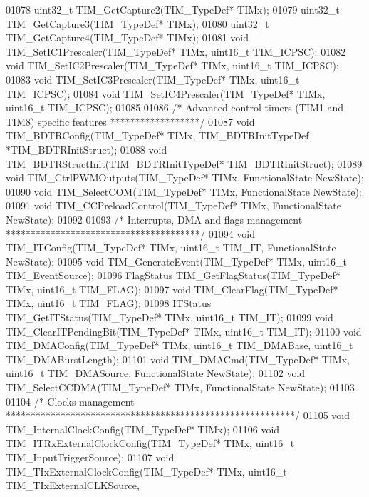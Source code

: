 \begin{DoxyCode}
01078 uint32\_t TIM_GetCapture2(TIM\_TypeDef* TIMx);
01079 uint32\_t TIM_GetCapture3(TIM\_TypeDef* TIMx);
01080 uint32\_t TIM_GetCapture4(TIM\_TypeDef* TIMx);
01081 \textcolor{keywordtype}{void} TIM_SetIC1Prescaler(TIM\_TypeDef* TIMx, uint16\_t TIM\_ICPSC);
01082 \textcolor{keywordtype}{void} TIM_SetIC2Prescaler(TIM\_TypeDef* TIMx, uint16\_t TIM\_ICPSC);
01083 \textcolor{keywordtype}{void} TIM_SetIC3Prescaler(TIM\_TypeDef* TIMx, uint16\_t TIM\_ICPSC);
01084 \textcolor{keywordtype}{void} TIM_SetIC4Prescaler(TIM\_TypeDef* TIMx, uint16\_t TIM\_ICPSC);
01085 
01086 \textcolor{comment}{/* Advanced-control timers (TIM1 and TIM8) specific features ******************/}
01087 \textcolor{keywordtype}{void} TIM_BDTRConfig(TIM\_TypeDef* TIMx, TIM\_BDTRInitTypeDef *TIM\_BDTRInitStruct);
01088 \textcolor{keywordtype}{void} TIM_BDTRStructInit(TIM\_BDTRInitTypeDef* TIM\_BDTRInitStruct);
01089 \textcolor{keywordtype}{void} TIM_CtrlPWMOutputs(TIM\_TypeDef* TIMx, FunctionalState NewState);
01090 \textcolor{keywordtype}{void} TIM_SelectCOM(TIM\_TypeDef* TIMx, FunctionalState NewState);
01091 \textcolor{keywordtype}{void} TIM_CCPreloadControl(TIM\_TypeDef* TIMx, FunctionalState NewState);
01092 
01093 \textcolor{comment}{/* Interrupts, DMA and flags management ***************************************/}
01094 \textcolor{keywordtype}{void} TIM_ITConfig(TIM\_TypeDef* TIMx, uint16\_t TIM\_IT, FunctionalState NewState);
01095 \textcolor{keywordtype}{void} TIM_GenerateEvent(TIM\_TypeDef* TIMx, uint16\_t TIM\_EventSource);
01096 FlagStatus TIM_GetFlagStatus(TIM\_TypeDef* TIMx, uint16\_t TIM\_FLAG);
01097 \textcolor{keywordtype}{void} TIM_ClearFlag(TIM\_TypeDef* TIMx, uint16\_t TIM\_FLAG);
01098 ITStatus TIM_GetITStatus(TIM\_TypeDef* TIMx, uint16\_t TIM\_IT);
01099 \textcolor{keywordtype}{void} TIM_ClearITPendingBit(TIM\_TypeDef* TIMx, uint16\_t TIM\_IT);
01100 \textcolor{keywordtype}{void} TIM_DMAConfig(TIM\_TypeDef* TIMx, uint16\_t TIM\_DMABase, uint16\_t TIM\_DMABurstLength);
01101 \textcolor{keywordtype}{void} TIM_DMACmd(TIM\_TypeDef* TIMx, uint16\_t TIM\_DMASource, FunctionalState NewState);
01102 \textcolor{keywordtype}{void} TIM_SelectCCDMA(TIM\_TypeDef* TIMx, FunctionalState NewState);
01103 
01104 \textcolor{comment}{/* Clocks management **********************************************************/}
01105 \textcolor{keywordtype}{void} TIM_InternalClockConfig(TIM\_TypeDef* TIMx);
01106 \textcolor{keywordtype}{void} TIM_ITRxExternalClockConfig(TIM\_TypeDef* TIMx, uint16\_t TIM\_InputTriggerSource);
01107 \textcolor{keywordtype}{void} TIM_TIxExternalClockConfig(TIM\_TypeDef* TIMx, uint16\_t TIM\_TIxExternalCLKSource,

\end{DoxyCode}
